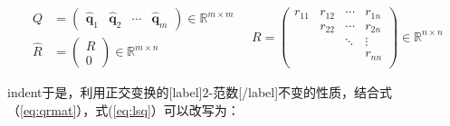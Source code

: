 \documentclass[UTF8,nofonts]{ctexart}
\begin{document}
\begin{equation}
	\label{eq:qrmat}
	\begin{aligned}
		Q&=
		\begin{pmatrix}
			\hat{\boldsymbol{q}}_1 & \hat{\boldsymbol{q}}_2 & \cdots & \hat{\boldsymbol{q}}_m
		\end{pmatrix}
		\in\mathbb{R}^{m \times m} \\
		\hat{R}&=\begin{pmatrix}R \\ 0\end{pmatrix}\in\mathbb{R}^{m \times n}
	\end{aligned} \quad
	R=
	\begin{pmatrix}
		r_{11} & r_{12} & \cdots & r_{1n} \\
		& r_{22} & \cdots &	r_{2n} \\
		& & \ddots & \vdots \\
		& & & r_{nn} \\
	\end{pmatrix}\in\mathbb{R}^{n \times n}
\end{equation}

indent于是，利用正交变换的[label]$2$-范数[/label]不变的性质，结合式（\ref{eq:qrmat}），式(\ref{eq:lsq}）可以改写为：
\end{document}
